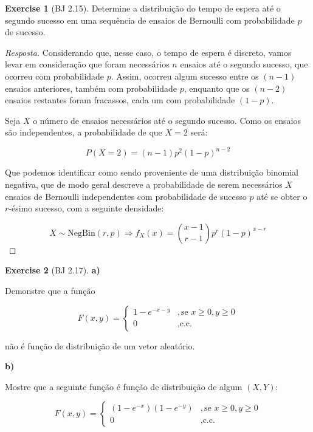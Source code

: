 \documentclass[
]{article}
\theoremstyle{definition}
\theoremstyle{definition}
\theoremstyle{definition}
\newtheorem{exercise}{Exercise}[section]
\theoremstyle{definition}
\theoremstyle{remark}
\begin{document}
\begin{exercise}[BJ 2.15]
Determine a distribuição do tempo de espera até o segundo sucesso em uma sequência de ensaios de Bernoulli com probabilidade \(p\) de sucesso.
\end{exercise}

\begin{proof}[Resposta]
Considerando que, nesse caso, o tempo de espera é discreto, vamos levar em consideração que foram necessários \(n\) ensaios até o segundo sucesso, que ocorreu com probabilidade \(p\). Assim, ocorreu algum sucesso entre os \((n-1)\) ensaios anteriores, também com probabilidade \(p\), enquanto que os \((n-2)\) ensaios restantes foram fracassos, cada um com probabilidade \((1 - p)\).

Seja \(X\) o número de ensaios necessários até o segundo sucesso. Como os ensaios são independentes, a probabilidade de que \(X = 2\) será:

\begin{equation*}
P(X = 2) = (n-1)p^{2}(1-p)^{n-2}
\end{equation*}

Que podemos identificar como sendo proveniente de uma distribuição binomial negativa, que de modo geral descreve a probabilidade de serem necessários \(X\) ensaios de Bernoulli independentes com probabilidade de sucesso \(p\) até se obter o \(r\)-ésimo sucesso, com a seguinte densidade:

\begin{equation*}
X \sim \mathrm{NegBin}(r,p) \Rightarrow f_{X}(x) = \binom{x-1}{r-1}p^{r}(1-p)^{x-r}
\end{equation*}
\end{proof}

\begin{exercise}[BJ 2.17]
\textbf{a)}

Demonstre que a função

\begin{equation*}
F(x,y) = \begin{cases}
1 - e^{-x-y} &,\text{se }x \ge 0, y \ge 0 \\
0 &,\text{c.c.}
\end{cases}
\end{equation*}

não é função de distribuição de um vetor aleatório.

\textbf{b)}

Mostre que a seguinte função é função de distribuição de algum \((X,Y)\):

\begin{equation*}
F(x,y) = \begin{cases}
(1 - e^{-x})(1 - e^{-y}) &,\text{se }x \ge 0, y \ge 0 \\
0 &,\text{c.c.}
\end{cases}
\end{equation*}
\end{exercise}
\end{document}
